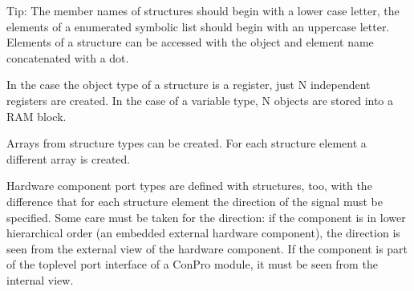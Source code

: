 \documentclass[a4paper,12pt,twoside,english]{article}
\begin{document}
\vskip5pt
Tip: The member names of structures should begin with a lower case letter, the elements of a enumerated symbolic list should begin with an uppercase letter.
Elements of a structure can be accessed with the object and element name concatenated with a dot.


\vskip5pt
In the case the object type of a structure is a register, just N independent registers are created. In the case of a variable type, N objects are stored into a
RAM block.


\vskip5pt
Arrays from structure types can be created. For each structure element a different array is created.


\vskip5pt
Hardware component port types are defined with structures, too, with the difference that for each structure element the direction of the signal must be
specified. Some care must be taken for the direction: if the component is in lower hierarchical order (an embedded external hardware component), the direction
is seen from the external view of the hardware component. If the component is part of the toplevel port interface of a ConPro module, it must be seen from the
internal view.


\vskip5pt
\end{document}
